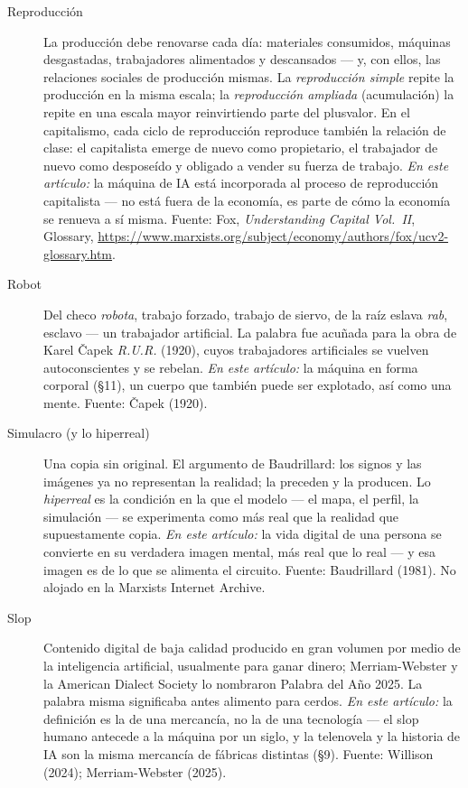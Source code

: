 \documentclass[11pt]{article}
\begin{document}
\begin{description}
\item[Reproducción] La producción debe renovarse cada día: materiales
consumidos, máquinas desgastadas, trabajadores alimentados y
descansados --- y, con ellos, las relaciones sociales de producción
mismas. La \emph{reproducción simple} repite la producción en la misma
escala; la \emph{reproducción ampliada} (acumulación) la repite en una
escala mayor reinvirtiendo parte del plusvalor. En el capitalismo, cada
ciclo de reproducción reproduce también la relación de clase: el
capitalista emerge de nuevo como propietario, el trabajador de nuevo
como desposeído y obligado a vender su fuerza de trabajo. \emph{En este
artículo:} la máquina de IA está incorporada al proceso de reproducción
capitalista --- no está fuera de la economía, es parte de cómo la
economía se renueva a sí misma. Fuente: Fox, \emph{Understanding
Capital Vol.~II}, Glossary,
\url{https://www.marxists.org/subject/economy/authors/fox/ucv2-glossary.htm}.

\item[Robot] Del checo \emph{robota}, trabajo forzado, trabajo de
siervo, de la raíz eslava \emph{rab}, esclavo --- un trabajador
artificial. La palabra fue acuñada para la obra de Karel \v{C}apek
\emph{R.U.R.} (1920), cuyos trabajadores artificiales se vuelven
autoconscientes y se rebelan. \emph{En este artículo:} la máquina en
forma corporal (§11), un cuerpo que también puede ser explotado, así
como una mente. Fuente: \v{C}apek (1920).

\item[Simulacro (y lo hiperreal)] Una copia sin original. El argumento
de Baudrillard: los signos y las imágenes ya no representan la
realidad; la preceden y la producen. Lo \emph{hiperreal} es la
condición en la que el modelo --- el mapa, el perfil, la simulación ---
se experimenta como más real que la realidad que supuestamente copia.
\emph{En este artículo:} la vida digital de una persona se convierte
en su verdadera imagen mental, más real que lo real --- y esa imagen es
de lo que se alimenta el circuito. Fuente: Baudrillard (1981). No
alojado en la Marxists Internet Archive.

\item[Slop] Contenido digital de baja calidad producido en gran volumen
por medio de la inteligencia artificial, usualmente para ganar dinero;
Merriam-Webster y la American Dialect Society lo nombraron Palabra del
Año 2025. La palabra misma significaba antes alimento para cerdos.
\emph{En este artículo:} la definición es la de una mercancía, no la de
una tecnología --- el slop humano antecede a la máquina por un siglo, y
la telenovela y la historia de IA son la misma mercancía de fábricas
distintas (§9). Fuente: Willison (2024); Merriam-Webster (2025).


\end{description}
\end{document}
